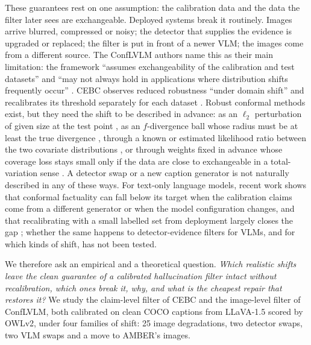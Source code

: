 These guarantees rest on one assumption: the calibration data and the data the filter later sees are exchangeable. Deployed systems break it routinely. Images arrive blurred, compressed or noisy; the detector that supplies the evidence is upgraded or replaced; the filter is put in front of a newer VLM; the images come from a different source. The ConfLVLM authors name this as their main limitation: the framework ``assumes exchangeability of the calibration and test datasets'' and ``may not always hold in applications where distribution shifts frequently occur'' \citep[Limitations]{conflvlm}. CEBC observes reduced robustness ``under domain shift'' and recalibrates its threshold separately for each dataset \citep[Secs.~5.1--5.2]{cebc}. Robust conformal methods exist, but they need the shift to be described in advance: as an $\ell_2$ perturbation of given size at the test point \citep{gendler2022adversarially}, as an $f$-divergence ball whose radius must be at least the true divergence \citep{cauchois2024robust}, through a known or estimated likelihood ratio between the two covariate distributions \citep{tibshirani2019covariate}, or through weights fixed in advance whose coverage loss stays small only if the data are close to exchangeable in a total-variation sense \citep{barber2023beyond}. A detector swap or a new caption generator is not naturally described in any of these ways. For text-only language models, recent work shows that conformal factuality can fall below its target when the calibration claims come from a different generator \citep{chen2026conformalrag} or when the model configuration changes, and that recalibrating with a small labelled set from deployment largely closes the gap \citep{zhu2026configuration}; whether the same happens to detector-evidence filters for VLMs, and for which kinds of shift, has not been tested.

We therefore ask an empirical and a theoretical question. \emph{Which realistic shifts leave the clean guarantee of a calibrated hallucination filter intact without recalibration, which ones break it, why, and what is the cheapest repair that restores it?} We study the claim-level filter of CEBC and the image-level filter of ConfLVLM, both calibrated on clean COCO captions from LLaVA-1.5 scored by OWLv2, under four families of shift: 25 image degradations, two detector swaps, two VLM swaps and a move to AMBER's images.

